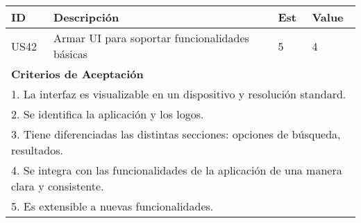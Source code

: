 \bigskip
\begin{tabular}{|p{1cm}|p{10cm}|p{1cm}|p{1cm}|}
\hline
\hline
\textbf{ID}&\textbf{Descripción}&\textbf{Est}&\textbf{Value}\\
\hline
\hline
US42&Armar UI para soportar funcionalidades básicas& 5& 4\\
\hline
\hline
\multicolumn{4}{|p{13cm}|}{ \textbf{Criterios de Aceptación}} \\
\hline
\hline
\multicolumn{4}{|p{13cm}|}{1. La interfaz es visualizable en un dispositivo y resolución standard.}\\
\multicolumn{4}{|p{13cm}|}{2. Se identifica la aplicación y los logos.}\\
\multicolumn{4}{|p{13cm}|}{3. Tiene diferenciadas las distintas secciones: opciones de búsqueda, resultados.}\\
\multicolumn{4}{|p{13cm}|}{4. Se integra con las funcionalidades de la aplicación de una manera clara y consistente.}\\
\multicolumn{4}{|p{13cm}|}{5. Es extensible a nuevas funcionalidades.}\\
\hline
\hline
\end{tabular}

